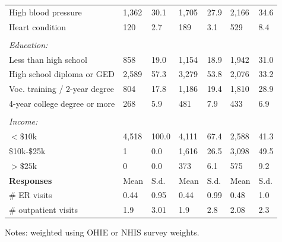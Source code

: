 \documentclass[hidelinks,12pt]{article}
\begin{document}
\begin{appendices}
\begin{singlespace}
\begin{longtable}{lllllll}
		\hspace{3mm}High blood pressure & 1,362 & 30.1 & 1,705 & 27.9 & 2,166 & 34.6  \\ 
		
		\hspace{3mm}Heart condition & 120 & 2.7 & 189 & 3.1 & 529 & 8.4 \\ 
		&  & & &  &  & \\ 
		\textit{Education:} &  & & &  &  & \\  
		\hspace{3mm}Less than high school  & 858 & 19.0 & 1,154 & 18.9 & 1,942 & 31.0  \\ 
		
		\hspace{3mm}High school diploma or GED & 2,589 & 57.3 & 3,279 & 53.8 & 2,076 & 33.2   \\ 
		
		\hspace{3mm}Voc. training / 2-year degree & 804 & 17.8 & 1,186 & 19.4 & 1,810 & 28.9  \\ 
		
		\hspace{3mm}4-year college degree or more & 268 & 5.9 & 481 & 7.9 & 433 & 6.9  \\ 
		&  & & &  &  & \\ 
		\textit{Income:} &  & & &  &  & \\ 
		\hspace{3mm} $<\$10$k & 4,518 & 100.0 & 4,111 & 67.4 & 2,588 & 41.3  \\
		
		\hspace{3mm} \$10k-\$25k & 1 & 0.0 & 1,616 & 26.5 & 3,098 & 49.5 \\
		
		\hspace{3mm} $>\$25$k & 0 & 0.0 & 373 & 6.1 & 575 & 9.2   \\
		\hline
		\hline
		\textbf{Responses} &  Mean & S.d. & Mean & S.d. & Mean & S.d. \\  
		\hspace{3mm}$\#$ ER visits &  0.44 & 0.95 & 0.44 & 0.99 & 0.48 & 1.0  \\  
		\hspace{3mm}$\#$ outpatient visits & 1.9 & 3.01 & 1.9 & 2.8 & 2.08 & 2.3 \\
		\hline
		\hline
	\end{longtable}
\noindent
\footnotesize{Notes: weighted using OHIE or NHIS survey weights.}
\end{singlespace}
\restoregeometry


\end{appendices}
\end{document}
